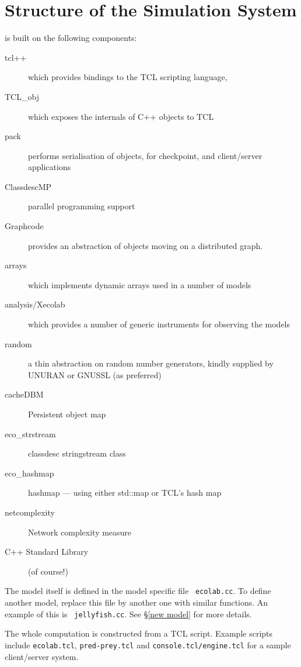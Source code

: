 \section{Structure of the \protect\EcoLab{} Simulation System}

\EcoLab{} is built on the following components:
\begin{description}
\item[tcl++] which provides bindings to the TCL scripting language,
\item[TCL\_obj] which exposes the internals of C++ objects to TCL
\item[pack] performs serialisation of objects, for checkpoint, and
  client/server applications
\item[ClassdescMP] parallel programming support
\item[Graphcode] provides an abstraction of objects moving on a
  distributed graph.
\item[arrays] which implements dynamic arrays used in a number of
  \EcoLab models
\item[analysis/Xecolab] which provides a number of generic instruments
  for observing the \EcoLab{} models
\item[random] a thin abstraction on random number generators, kindly
  supplied by UNURAN or GNUSSL (as preferred)
\item[cacheDBM] Persistent object map
\item[eco\_strstream] classdesc stringstream class
\item[eco\_hashmap] hashmap --- using either std::map or TCL's hash map
\item[netcomplexity] Network complexity measure
\item[C++ Standard Library] (of course!)
\end{description}

The \EcoLab{} model itself is defined in the model specific file {\tt
  ecolab.cc}. To define another model, replace this file by another
  one with similar functions. An example of this is {\tt
  jellyfish.cc}. See \S\ref{new model} for more details.

The whole computation is constructed from a TCL\cite{Ousterhout94}
script. Example scripts include {\tt ecolab.tcl}, {\tt pred-prey.tcl}
 and {\tt console.tcl/engine.tcl} for a sample
client/server system.

